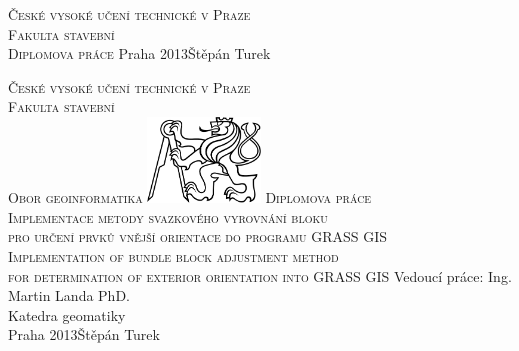 \begin{center}
\newcommand{\napisCVUT}{České vysoké učení technické v Praze}
\newcommand{\napisFS}{Fakulta stavební}
\newcommand{\napisObor}{Obor geoinformatika}
\newcommand{\napisKatedra}{Katedra geomatiky}
\newcommand{\napisVedouci}{Ing. Martin Landa PhD.}
\newcommand{\napisAutor}{Štěpán Turek}
\newcommand{\napisDatum}{Praha 2013}
\newcommand{\napisNazevI}{Implementace metody svazkového vyrovnání bloku}
\newcommand{\napisNazevII}{pro určení prvků vnější orientace do programu GRASS GIS}
\newcommand{\napisNazevAjI}{Implementation of bundle block adjustment method}
\newcommand{\napisNazevAjII}{for determination of exterior orientation into GRASS GIS}
\newcommand{\napisBakalarka}{Diplomova práce}
\newcommand{\napisPraha}{Praha 2013}


%
\newcommand{\velka}[1]{\textsc{#1}}
%
% 
\newif\ifpatitul
\patitultrue

\ifpatitul
{\Large\velka{\napisCVUT}}\\
\velka{\Large\napisFS}\\
\vfill
{\LARGE\velka{\napisBakalarka}}
\vfill
{\large\napisPraha\hfill\napisAutor}
\newpage
\fi%


{\Large\velka{\napisCVUT}}\\
{\Large\velka{\napisFS}}\\
{\Large\velka{\napisObor}}
\vfill
\includegraphics[width=3cm]{logo_cvut_cb} %
\vfill
{\Large\velka{\napisBakalarka}}\\
{\Large\velka{\napisNazevI\\
\napisNazevII}}\\
{\large\velka{\napisNazevAjI\\
\napisNazevAjII}}
\vfill
{\large%
Vedoucí práce: \napisVedouci\\
\napisKatedra\\
\bigskip
\napisDatum\hfill\napisAutor}
\end{center}
